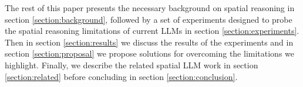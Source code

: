 The rest of this paper presents the necessary background on spatial reasoning in section \ref{section:background}, followed by a set of experiments designed to probe the spatial reasoning limitations of current LLMs in section \ref{section:experiments}.
Then in section \ref{section:results} we discuss the results of the experiments and in section \ref{section:proposal} we propose solutions for overcoming the limitations we highlight.
Finally, we describe the related spatial LLM work in section \ref{section:related} before concluding in section \ref{section:conclusion}. 




